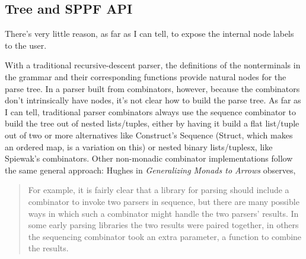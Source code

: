 \documentclass[12pt]{article}
\begin{document}




\subsection{Tree and SPPF API}
\label{sec:tree_sppf_api}

There's very little reason, as far as I can tell, to expose the
internal node labels to the user.

With a traditional recursive-descent parser, the definitions of the
nonterminals in the grammar and their corresponding functions provide
natural nodes for the parse tree.  In a parser built from combinators,
however, because the combinators don't intrinsically have nodes, it's
not clear how to build the parse tree.  As far as I can tell,
traditional parser combinators always use the sequence combinator to
build the tree out of nested lists/tuples, either by having it build a
flat list/tuple out of two or more alternatives like Construct's
Sequence (Struct, which makes an ordered map, is a variation on this)
or nested binary lists/tuplesx, like Spiewak's combinators.  Other
non-monadic combinator implementations follow the same general
approach: Hughes in \emph{Generalizing Monads to Arrows} observes,

\begin{quote}
  For example, it is fairly clear that a library for parsing should
  include a combinator to invoke two parsers in sequence, but there
  are many possible ways in which such a combinator might handle the
  two parsers' results.  In some early parsing libraries the two
  results were paired together, in others the sequencing combinator
  took an extra parameter, a function to combine the results.
\end{quote}
\end{document}
